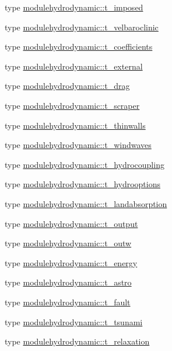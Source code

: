 \begin{DoxyCompactItemize}
type \mbox{\hyperlink{structmodulehydrodynamic_1_1t__imposed}{modulehydrodynamic\+::t\+\_\+imposed}}
\item 
type \mbox{\hyperlink{structmodulehydrodynamic_1_1t__velbaroclinic}{modulehydrodynamic\+::t\+\_\+velbaroclinic}}
\item 
type \mbox{\hyperlink{structmodulehydrodynamic_1_1t__coefficients}{modulehydrodynamic\+::t\+\_\+coefficients}}
\item 
type \mbox{\hyperlink{structmodulehydrodynamic_1_1t__external}{modulehydrodynamic\+::t\+\_\+external}}
\item 
type \mbox{\hyperlink{structmodulehydrodynamic_1_1t__drag}{modulehydrodynamic\+::t\+\_\+drag}}
\item 
type \mbox{\hyperlink{structmodulehydrodynamic_1_1t__scraper}{modulehydrodynamic\+::t\+\_\+scraper}}
\item 
type \mbox{\hyperlink{structmodulehydrodynamic_1_1t__thinwalls}{modulehydrodynamic\+::t\+\_\+thinwalls}}
\item 
type \mbox{\hyperlink{structmodulehydrodynamic_1_1t__windwaves}{modulehydrodynamic\+::t\+\_\+windwaves}}
\item 
type \mbox{\hyperlink{structmodulehydrodynamic_1_1t__hydrocoupling}{modulehydrodynamic\+::t\+\_\+hydrocoupling}}
\item 
type \mbox{\hyperlink{structmodulehydrodynamic_1_1t__hydrooptions}{modulehydrodynamic\+::t\+\_\+hydrooptions}}
\item 
type \mbox{\hyperlink{structmodulehydrodynamic_1_1t__landabsorption}{modulehydrodynamic\+::t\+\_\+landabsorption}}
\item 
type \mbox{\hyperlink{structmodulehydrodynamic_1_1t__output}{modulehydrodynamic\+::t\+\_\+output}}
\item 
type \mbox{\hyperlink{structmodulehydrodynamic_1_1t__outw}{modulehydrodynamic\+::t\+\_\+outw}}
\item 
type \mbox{\hyperlink{structmodulehydrodynamic_1_1t__energy}{modulehydrodynamic\+::t\+\_\+energy}}
\item 
type \mbox{\hyperlink{structmodulehydrodynamic_1_1t__astro}{modulehydrodynamic\+::t\+\_\+astro}}
\item 
type \mbox{\hyperlink{structmodulehydrodynamic_1_1t__fault}{modulehydrodynamic\+::t\+\_\+fault}}
\item 
type \mbox{\hyperlink{structmodulehydrodynamic_1_1t__tsunami}{modulehydrodynamic\+::t\+\_\+tsunami}}
\item 
type \mbox{\hyperlink{structmodulehydrodynamic_1_1t__relaxation}{modulehydrodynamic\+::t\+\_\+relaxation}}

\end{DoxyCompactItemize}
